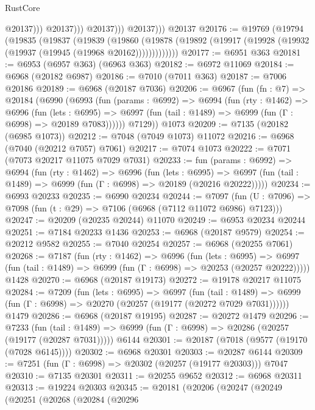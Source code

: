 \begin{lexlean}{RustCore}
\begin{coremodule}
                            @20137)))
                      @20137)))
                @20137)))
          @20137)))
    @20137
@20176 := @19769
    (@19794
      (@19835
        (@19837
          (@19839
            (@19860
              (@19878 (@19892 (@19917 (@19928 (@19932 (@19937 (@19945 (@19968 @20162)))))))))))))
@20177 := @6951 @363
@20181 := @6953 (@6957 @363) (@6963 @363)
@20182 := @6972 @11069
@20184 := @6968 (@20182 @6987)
@20186 := @7010 (@7011 @363)
@20187 := @7006 @20186
@20189 := @6968 (@20187 @7036)
@20206 := @6967
    (fun (fn : @7) =>
    @20184
      (@6990
        (@6993
          (fun (params : @6992) =>
          @6994
            (fun (rty : @1462) =>
            @6996
              (fun (lets : @6995) =>
              @6997 (fun (tail : @1489) => @6999 (fun (Γ : @6998) => @20189 @7083))))))
        @7129))
    @1073
@20209 := @7135 (@20182 (@6985 @1073))
@20212 := @7048 (@7049 @1073) @11072
@20216 := @6968 (@7040 (@20212 @7057) @7061)
@20217 := @7074 @1073
@20222 := @7071 (@7073 @20217 @11075 @7029 @7031)
@20233 := fun (params : @6992) =>
  @6994
    (fun (rty : @1462) =>
    @6996
      (fun (lets : @6995) =>
      @6997 (fun (tail : @1489) => @6999 (fun (Γ : @6998) => @20189 (@20216 @20222)))))
@20234 := @6993 @20233
@20235 := @6990 @20234
@20244 := @7097
    (fun (U : @7096) => @7098 (fun (t : @29) => @7106 (@6968 (@7112 @11072 @6986) @7123)))
@20247 := @20209 (@20235 @20244) @11070
@20249 := @6953 @20234 @20244
@20251 := @7184 @20233 @1436
@20253 := @6968 (@20187 @9579)
@20254 := @20212 @9582
@20255 := @7040 @20254
@20257 := @6968 (@20255 @7061)
@20268 := @7187
    (fun (rty : @1462) =>
    @6996
      (fun (lets : @6995) =>
      @6997 (fun (tail : @1489) => @6999 (fun (Γ : @6998) => @20253 (@20257 @20222)))))
    @1428
@20270 := @6968 (@20187 @19173)
@20272 := @19178 @20217 @11075
@20284 := @7209
    (fun (lets : @6995) =>
    @6997
      (fun (tail : @1489) =>
      @6999 (fun (Γ : @6998) => @20270 (@20257 (@19177 (@20272 @7029 @7031))))))
    @1479
@20286 := @6968 (@20187 @19195)
@20287 := @20272 @1479
@20296 := @7233
    (fun (tail : @1489) => @6999 (fun (Γ : @6998) => @20286 (@20257 (@19177 (@20287 @7031)))))
    @6144
@20301 := @20187 (@7018 (@9577 (@19170 (@7028 @6145))))
@20302 := @6968 @20301
@20303 := @20287 @6144
@20309 := @7251 (fun (Γ : @6998) => @20302 (@20257 (@19177 @20303))) @7047
@20310 := @7135 @20301
@20311 := @20255 @9652
@20312 := @6968 @20311
@20313 := @19224 @20303
@20345 := @20181
    (@20206
      (@20247
        (@20249
          (@20251
            (@20268
              (@20284
                (@20296

\end{coremodule}
\end{lexlean}
